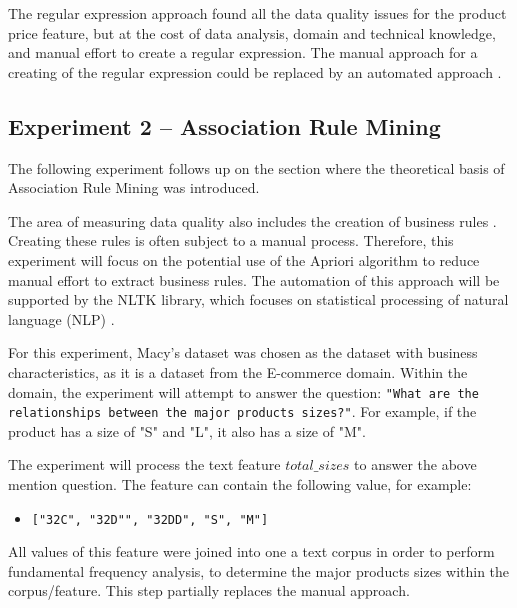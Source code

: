 					The regular expression approach found all the data quality issues for the product price feature, but at the cost of data analysis, domain and technical knowledge, and manual effort to create a regular expression. The manual approach for a creating of the regular expression could be replaced by an automated approach .
					
			
	    	\subsection{Experiment 2 -- Association Rule Mining}
	    	\label{subsec:experiment_2_association_rule_mining}
    		
    			The following experiment follows up on the section  where the theoretical basis of Association Rule Mining was introduced.
    			
    			The area of measuring data quality also includes the creation of business rules \cite{Ehrlinger2019}. Creating these rules is often subject to a manual process. Therefore, this experiment will focus on the potential use of the Apriori algorithm to reduce manual effort to extract business rules. The automation of this approach will be supported by the NLTK library, which focuses on statistical processing of natural language (NLP) .
    			
    			For this experiment, Macy's dataset was chosen as the dataset with business characteristics, as it is a dataset from the E-commerce domain. Within the domain, the experiment will attempt to answer the question: \texttt{"What are the relationships between the major products sizes?"}. For example, if the product has a size of "S" and "L", it also has a size of "M".
    			
    			The experiment will process the text feature $total\_sizes$ to answer the above mention question. The feature can contain the following value, for example:
    			
    			\begin{itemize}
    				\item \texttt{["32C", "32D"", "32DD", "S", "M"]}
    			\end{itemize}
    			
    			All values of this feature were joined into one a text corpus in order to perform fundamental frequency analysis, to determine the major products sizes within the corpus/feature. This step partially replaces the manual approach.
    			
